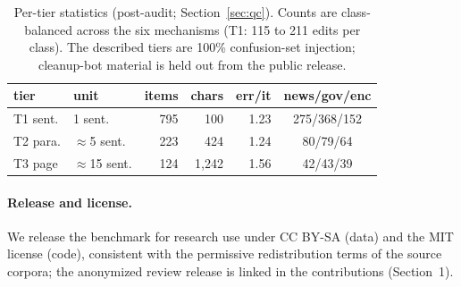\documentclass[11pt]{article}
\begin{document}
\begin{table}[t]
\centering\small\setlength{\tabcolsep}{4pt}
\begin{tabular}{@{}llrrrc@{}}
\toprule
tier & unit & items & chars & err/it & news/gov/enc \\
\midrule
T1 sent.  & 1 sent.          & 795 & 100     & 1.23 & 275/368/152 \\
T2 para.  & $\approx$5 sent.  & 223 & 424     & 1.24 & 80/79/64 \\
T3 page   & $\approx$15 sent. & 124 & 1{,}242 & 1.56 & 42/43/39 \\
\bottomrule
\end{tabular}
\caption{Per-tier statistics (post-audit; Section~\ref{sec:qc}). Counts are class-balanced across the
six mechanisms (T1: 115 to 211 edits per class). The described tiers are 100\% confusion-set
injection; cleanup-bot material is held out from the public release.}
\label{tab:tiers}
\end{table}

\paragraph{Release and license.} We release the benchmark for research use under CC BY-SA (data)
and the MIT license (code), consistent with the permissive redistribution terms of the source
corpora; the anonymized review release is linked in the contributions (Section~1).
\end{document}
